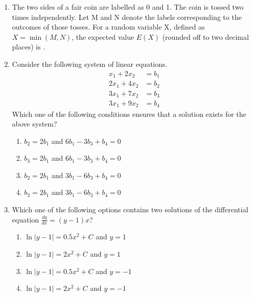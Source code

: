 \documentclass[a4paper, 11pt]{article}
\begin{document}
\begin{enumerate}
    \hfill{}

    \item The two sides of a fair coin are labelled as 0 and 1. The coin is tossed two times independently. Let M and N denote the labels corresponding to the outcomes of those tosses. For a random variable X, defined as $X = \min(M,N)$, the expected value $E(X)$ (rounded off to two decimal places) is \underline{\hspace{2cm}}.

    \hfill{}

    \item Consider the following system of linear equations.
    \begin{align*}
        x_1 + 2x_2 &= b_1 \\
        2x_1 + 4x_2 &= b_2 \\
        3x_1 + 7x_2 &= b_3 \\
        3x_1 + 9x_2 &= b_4
    \end{align*}
    Which one of the following conditions ensures that a solution exists for the above system?
    \begin{enumerate}
        \item $b_2=2b_1$ and $6b_1 - 3b_3 + b_4 = 0$
        \item $b_3=2b_1$ and $6b_1 - 3b_3 + b_4 = 0$
        \item $b_2=2b_1$ and $3b_1 - 6b_3 + b_4 = 0$
        \item $b_3=2b_1$ and $3b_1 - 6b_3 + b_4 = 0$
    \end{enumerate}

    \hfill{}

    \item Which one of the following options contains two solutions of the differential equation $\frac{dy}{dx} = (y-1)x$?
    \begin{enumerate}
        \item $\ln|y-1| = 0.5x^2+C$ and $y=1$
        \item $\ln|y-1| = 2x^2+C$ and $y=1$
        \item $\ln|y-1| = 0.5x^2+C$ and $y=-1$
        \item $\ln|y-1| = 2x^2+C$ and $y=-1$
    \end{enumerate}

    \hfill{}
    

\end{enumerate}
\end{document}
